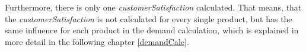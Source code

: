 Furthermore, there is only one \textit{customerSatisfaction} calculated. That means, that the \textit{customerSatisfaction} is not calculated for every single product, but has the same influence for each product in the demand calculation, which is explained in more detail in the following chapter \ref{demandCalc}.



\begin{comment}
Moreover, there are three main levels of customer requirements regarding products: Must haves, satisfiers and delighters. \cite{krienke_messung_2009}
Must haves are the bare minimum requirements expected of customers. The customers do not show exceptional appreciation for the must haves, but if they are not met, the customer will show dissatisfaction. Satisfiers are the requirements that the customer expressly wishes. If you offer better or more of these satisfiers, then the customers will appreciate it more and be more satisfied. Delighters are the extras or the add-ons. The lack of these characteristics will not make the customer dissatisfied but adding these would greatly increase the customer's satisfaction. In our game, these three levels of customer requirements are included by the following calculation of the customer satisfaction, which depends on a product's \textit{totalProductQuality}. This means, if the user chooses newer, better components for producing a product, then the product's \textit{totalProductQuality} will increase, which again influences the calculation of the customer satisfaction.
    \begin{equation}
    \label{cS_Calc}
    \begin{aligned}
    If \; tPQ \leq \ 40: (0,6*tPQ + 0,15*tSQ + 0,1*lI + 0,1*cI + 0,05*eB)\\
    ElseIf \; tPQ \leq \ 60: (0,5*tPQ + 0,2*tSQ + 0,1*lI + 0,15*cI + 0,05*eB)\\
    Else: (0,45*tPQ + 0,25*tSQ + 0,1*lI + 0,15*cI + 0,05*eB)
    \end{aligned}
    \end{equation}
Each line of the calculation \ref{cS_Calc} refers to one of the three main levels of customer requirements. So, the first line of the calculation refers to a product's must haves, the second line refers to satisfiers and the third line refers to the delighters level of the customer requirements.
Although the calculation \ref{cS_Calc} looks quite static, this is not the case as the variables, on which the calculation is based, are not static but change continuously.
\end{comment}
